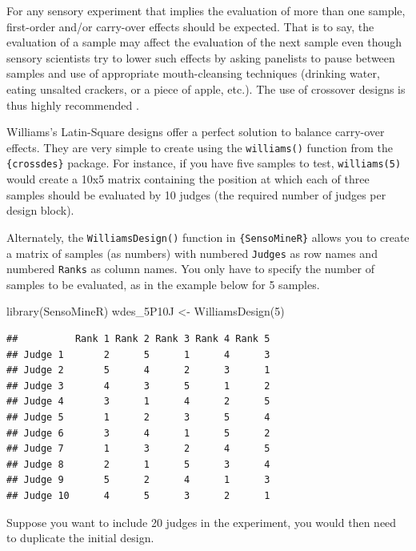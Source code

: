 \documentclass[
]{krantz}
\makeatletter
\newenvironment{Shaded}{\begin{snugshade}}{\end{snugshade}}
\newcommand{\DecValTok}[1]{\textcolor[rgb]{0.06,0.06,0.06}{#1}}
\newcommand{\FunctionTok}[1]{\textcolor[rgb]{0,0,0}{#1}}
\newcommand{\NormalTok}[1]{#1}
\newcommand{\OtherTok}[1]{\textcolor[rgb]{0.37,0.37,0.37}{#1}}
\newenvironment{kframe}{%
\medskip{}
\setlength{\fboxsep}{.8em}
 \def\at@end@of@kframe{}%
 \ifinner\ifhmode%
  \def\at@end@of@kframe{\end{minipage}}%
  \begin{minipage}{\columnwidth}%
 \fi\fi%
 \def\FrameCommand##1{\hskip\@totalleftmargin \hskip-\fboxsep
 \colorbox{shadecolor}{##1}\hskip-\fboxsep
     \hskip-\linewidth \hskip-\@totalleftmargin \hskip\columnwidth}%
 \MakeFramed {\advance\hsize-\width
   \@totalleftmargin\z@ \linewidth\hsize
   \@setminipage}}%
 {\par\unskip\endMakeFramed%
 \at@end@of@kframe}
\renewenvironment{Shaded}{\begin{kframe}}{\end{kframe}}
\makeatother
\begin{document}
For any sensory experiment that implies the evaluation of more than one sample, first-order and/or carry-over effects should be expected. That is to say, the evaluation of a sample may affect the evaluation of the next sample even though sensory scientists try to lower such effects by asking panelists to pause between samples and use of appropriate mouth-cleansing techniques (drinking water, eating unsalted crackers, or a piece of apple, etc.). The use of crossover designs is thus highly recommended \citep{Macfie1989}.

Williams's Latin-Square designs offer a perfect solution to balance carry-over effects. They are very simple to create using the \texttt{williams()} function from the \texttt{\{crossdes\}} package. For instance, if you have five samples to test, \texttt{williams(5)} would create a 10x5 matrix containing the position at which each of three samples should be evaluated by 10 judges (the required number of judges per design block).

Alternately, the \texttt{WilliamsDesign()} function in \texttt{\{SensoMineR\}} allows you to create a matrix of samples (as numbers) with numbered \texttt{Judges} as row names and numbered \texttt{Ranks} as column names. You only have to specify the number of samples to be evaluated, as in the example below for 5 samples.

\begin{Shaded}
\begin{Highlighting}[]
\FunctionTok{library}\NormalTok{(SensoMineR)}
\NormalTok{wdes\_5P10J }\OtherTok{\textless{}{-}} \FunctionTok{WilliamsDesign}\NormalTok{(}\DecValTok{5}\NormalTok{)}
\end{Highlighting}
\end{Shaded}

\begin{verbatim}
##          Rank 1 Rank 2 Rank 3 Rank 4 Rank 5
## Judge 1       2      5      1      4      3
## Judge 2       5      4      2      3      1
## Judge 3       4      3      5      1      2
## Judge 4       3      1      4      2      5
## Judge 5       1      2      3      5      4
## Judge 6       3      4      1      5      2
## Judge 7       1      3      2      4      5
## Judge 8       2      1      5      3      4
## Judge 9       5      2      4      1      3
## Judge 10      4      5      3      2      1
\end{verbatim}

Suppose you want to include 20 judges in the experiment, you would then need to duplicate the initial design.
\end{document}
